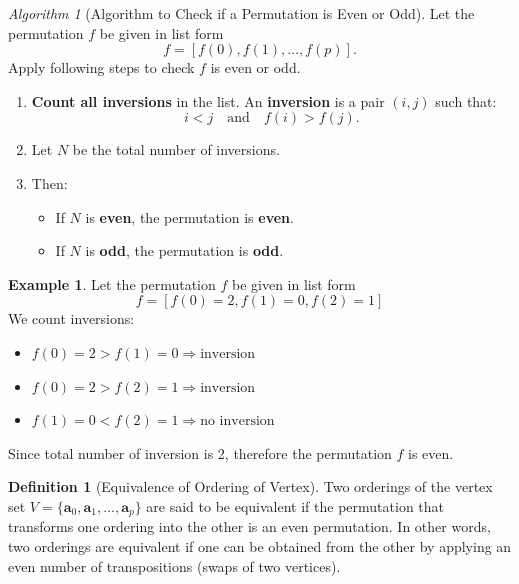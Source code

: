 \documentclass[12pt,oneside,reqno]{amsart}
\theoremstyle{plain}
\theoremstyle{definition}
\newtheorem{example}{Example}[section]
\newtheorem{definition}[theorem]{Definition}
\theoremstyle{remark}
\newtheorem{algorithm}{Algorithm}
\newcommand{\0}{{\textbf{0}}}
\begin{document}
\begin{algorithm}[Algorithm to Check if a Permutation is Even or Odd]
Let the permutation $f$ be given in list form 
\[
f = [f(0), f(1), \ldots, f(p)].
\]    
Apply following steps to check $f$ is even or odd. 
\begin{enumerate}
 \item \textbf{Count all inversions} in the list.  
    An \textbf{inversion} is a pair \( (i, j) \) such that:
    \[
    i < j \quad \text{and} \quad f(i) > f(j).
    \] 
 \item Let \( N \) be the total number of inversions.

    \item Then:
    \begin{itemize}
        \item If \( N \) is \textbf{even}, the permutation is \textbf{even}.
        \item If \( N \) is \textbf{odd}, the permutation is \textbf{odd}.
    \end{itemize}
\end{enumerate}
\end{algorithm}

\begin{example}
Let the permutation $f$ be given in list form 
\[
f = [f(0) = 2, f(1) = 0, f(2) = 1]
\]    
We count inversions:
\begin{itemize}
    \item \( f(0) = 2 > f(1) = 0 \Rightarrow \text{inversion} \)
    \item \( f(0) = 2 > f(2) = 1 \Rightarrow \text{inversion} \)
    \item \( f(1) = 0 < f(2) = 1 \Rightarrow \text{no inversion}\)
\end{itemize}
Since total number of inversion is 2, therefore the permutation $f$ is even. 
\end{example}

\begin{definition}[Equivalence of Ordering of Vertex]\label{d:Equivalence of Ordering of Vertex}
Two orderings of the vertex set  $V = \{\mathbf{a}_0, \mathbf{a}_1, \ldots, \mathbf{a}_p\}$
are said to be equivalent if the permutation that transforms one ordering into the other is an even permutation. In other words, two orderings are equivalent if one can be obtained from the other by applying an even number of transpositions (swaps of two vertices).
\end{definition}
\end{document}
